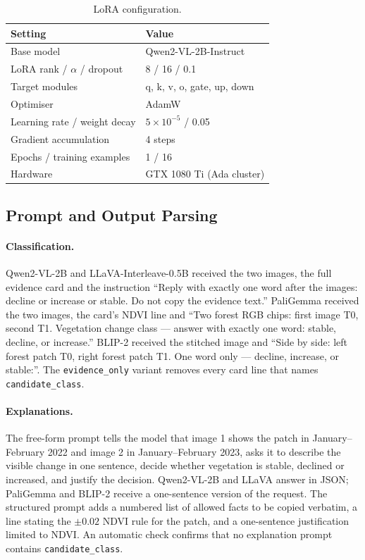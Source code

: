 \documentclass[11pt]{article}
\begin{document}
\begin{table}[h]
\centering
\small
\begin{tabular}{ll}
\toprule
Setting & Value \\
\midrule
Base model & Qwen2-VL-2B-Instruct \\
LoRA rank / $\alpha$ / dropout & 8 / 16 / 0.1 \\
Target modules & q, k, v, o, gate, up, down \\
Optimiser & AdamW \\
Learning rate / weight decay & $5\times10^{-5}$ / 0.05 \\
Gradient accumulation & 4 steps \\
Epochs / training examples & 1 / 16 \\
Hardware & GTX 1080 Ti (Ada cluster) \\
\bottomrule
\end{tabular}
\caption{LoRA configuration.}
\label{tab:ftconfig}
\end{table}

\subsection{Prompt and Output Parsing}

\paragraph{Classification.} Qwen2-VL-2B and LLaVA-Interleave-0.5B
received the two images, the full evidence card and the instruction
``Reply with exactly one word after the images: decline or increase or
stable. Do not copy the evidence text.'' PaliGemma received the two
images, the card's NDVI line and ``Two forest RGB chips: first image T0,
second T1. Vegetation change class --- answer with exactly one word:
stable, decline, or increase.'' BLIP-2 received the stitched image and
``Side by side: left forest patch T0, right forest patch T1. One word
only --- decline, increase, or stable:''. The \texttt{evidence\_only}
variant removes every card line that names \texttt{candidate\_class}.

\paragraph{Explanations.} The free-form prompt tells the model that
image 1 shows the patch in January--February 2022 and image 2 in
January--February 2023, asks it to describe the visible change in one
sentence, decide whether vegetation is stable, declined or increased,
and justify the decision. Qwen2-VL-2B and LLaVA answer in JSON;
PaliGemma and BLIP-2 receive a one-sentence version of the request. The structured prompt adds a
numbered list of allowed facts to be copied verbatim, a line stating
the $\pm 0.02$ NDVI rule for the patch, and a one-sentence justification
limited to NDVI. An automatic check confirms that no explanation prompt
contains \texttt{candidate\_class}.
\end{document}
